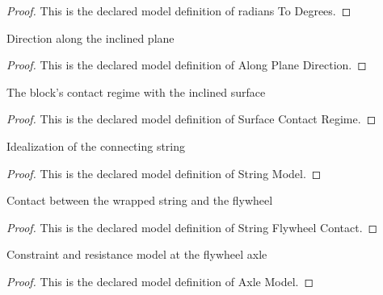 \begin{proof}
  This is the declared model definition of radians To Degrees.
\end{proof}
\begin{definition}
  \label{def:physics:phyx-mini-0785:phyxminiproblems-problemphyxmini0785-alongplanedirection}
  Direction along the inclined plane
\end{definition}
\begin{proof}
  This is the declared model definition of Along Plane Direction.
\end{proof}
\begin{definition}
  \label{def:physics:phyx-mini-0785:phyxminiproblems-problemphyxmini0785-surfacecontactregime}
  The block's contact regime with the inclined surface
\end{definition}
\begin{proof}
  This is the declared model definition of Surface Contact Regime.
\end{proof}
\begin{definition}
  \label{def:physics:phyx-mini-0785:phyxminiproblems-problemphyxmini0785-stringmodel}
  Idealization of the connecting string
\end{definition}
\begin{proof}
  This is the declared model definition of String Model.
\end{proof}
\begin{definition}
  \label{def:physics:phyx-mini-0785:phyxminiproblems-problemphyxmini0785-stringflywheelcontact}
  Contact between the wrapped string and the flywheel
\end{definition}
\begin{proof}
  This is the declared model definition of String Flywheel Contact.
\end{proof}
\begin{definition}
  \label{def:physics:phyx-mini-0785:phyxminiproblems-problemphyxmini0785-axlemodel}
  Constraint and resistance model at the flywheel axle
\end{definition}
\begin{proof}
  This is the declared model definition of Axle Model.
\end{proof}
